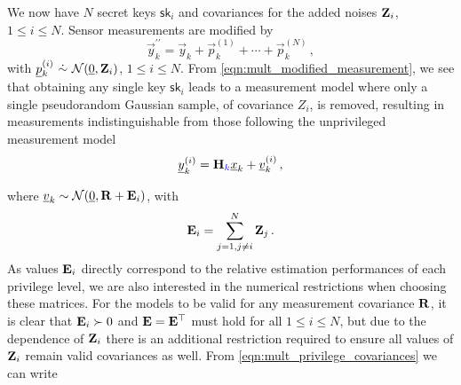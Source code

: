 \documentclass[letterpaper, 10 pt, conference]{ieeeconf}
\providecommand{\DIFadd}[1]{{\protect\color{blue}\uwave{#1}}} %
\providecommand{\DIFdel}[1]{{\protect\color{red}\sout{#1}}}                      %
\providecommand{\DIFaddbegin}{} %
\providecommand{\DIFaddend}{} %
\providecommand{\DIFdelbegin}{} %
\providecommand{\DIFdelend}{} %
\newcommand{\DIFscaledelfig}{0.5}
\newlength{\DIFdelgraphicswidth} %
\newlength{\DIFdelgraphicsheight} %
\newcommand{\DIFaddincludegraphics}[2][]{{\color{blue}\fbox{\DIFOincludegraphics[#1]{#2}}}} %
\newcommand{\DIFdelincludegraphics}[2][]{%
\sbox{\DIFdelgraphicsbox}{\DIFOincludegraphics[#1]{#2}}%
\settoboxwidth{\DIFdelgraphicswidth}{\DIFdelgraphicsbox} %
\settoboxtotalheight{\DIFdelgraphicsheight}{\DIFdelgraphicsbox} %
\scalebox{\DIFscaledelfig}{%
\parbox[b]{\DIFdelgraphicswidth}{\usebox{\DIFdelgraphicsbox}\\[-\baselineskip] \rule{\DIFdelgraphicswidth}{0em}}\llap{\resizebox{\DIFdelgraphicswidth}{\DIFdelgraphicsheight}{%
\setlength{\unitlength}{\DIFdelgraphicswidth}%
\begin{picture}(1,1)%
\thicklines\linethickness{2pt} %
{\color[rgb]{1,0,0}\put(0,0){\framebox(1,1){}}}%
{\color[rgb]{1,0,0}\put(0,0){\line( 1,1){1}}}%
{\color[rgb]{1,0,0}\put(0,1){\line(1,-1){1}}}%
\end{picture}%
}\hspace*{3pt}}} %
} %
\DeclareRobustCommand{\DIFaddbegin}{\DIFOaddbegin \let\includegraphics\DIFaddincludegraphics} %
\DeclareRobustCommand{\DIFaddend}{\DIFOaddend \let\includegraphics\DIFOincludegraphics} %
\DeclareRobustCommand{\DIFdelbegin}{\DIFOdelbegin \let\includegraphics\DIFdelincludegraphics} %
\DeclareRobustCommand{\DIFdelend}{\DIFOaddend \let\includegraphics\DIFOincludegraphics} %
\begin{document}
We now have $N$ secret keys $\mathsf{sk}_i$ and covariances for the added noises $\mat{Z}_i$, $1\leq i \leq N$. Sensor measurements are modified by
\begin{equation}\label{eqn:mult_modified_measurement}
   \vec{y}_k^{\prime\prime} = \vec{y}_k + \vec{p}^{(1)}_k + \cdots + \vec{p}^{(N)}_k\,,
\end{equation}
with $\vec{p}^{(i)}_k\ \dot{\sim}\ \mathcal{N}(\vec{0}, \mat{Z}_i)$, $1\leq i \leq N$. From \eqref{eqn:mult_modified_measurement}, we see that obtaining any single key $\mathsf{sk}_i$ leads to a measurement model where only a single pseudorandom Gaussian sample, of covariance \DIFdelbegin \DIFdel{$Z_i$}\DIFdelend \DIFaddbegin \DIFadd{$\mat{Z}_i$}\DIFaddend , is removed, resulting in measurements indistinguishable from those following the unprivileged measurement model
\begin{equation}
   \vec{y}_k^{(i)} = \mat{H}\DIFaddbegin \DIFadd{_k}\DIFaddend \vec{x}_k + \vec{v}^{(i)}_k\,,
\end{equation}
where \DIFdelbegin \DIFdel{${\underline{v}}_k\sim \mathcal{N}({\underline{0}},{{\mathbf{R}}}+{{\mathbf{E}}}_i)$}\DIFdelend \DIFaddbegin \DIFadd{$\vec{v}^{(i)}_k\sim \mathcal{N}(\vec{0},\mat{R}_k+\mat{E}_i)$}\DIFaddend , with
\begin{equation}\label{eqn:mult_privilege_covariances}
   {\ensuremath{{\mathbf{E}}}}_i = \sum^N_{j=1,j \neq i}{{\mathbf{Z}}}_j\,.
\end{equation}
As values ${{\mathbf{E}}}_i$ directly correspond to the relative estimation performances of each privilege level, we are also interested in the numerical restrictions when choosing these matrices. For the models to be valid for any measurement covariance \DIFdelbegin \DIFdel{${{\mathbf{R}}}$}\DIFdelend \DIFaddbegin \DIFadd{$\mat{R}_k$}\DIFaddend , it is clear that ${{\mathbf{E}}}_i\succ 0$ and \DIFdelbegin \DIFdel{${{\mathbf{E}}}={{\mathbf{E}}}^\top$ }\DIFdelend \DIFaddbegin \DIFadd{$\mat{E}_i=\mat{E}_i^\top$ }\DIFaddend must hold for all $1\leq i\leq N$, but due to the dependence of $\mat{Z}_i$ there is an additional restriction required to ensure all values of $\mat{Z}_i$ remain valid covariances as well. From \eqref{eqn:mult_privilege_covariances} we can write
\end{document}
